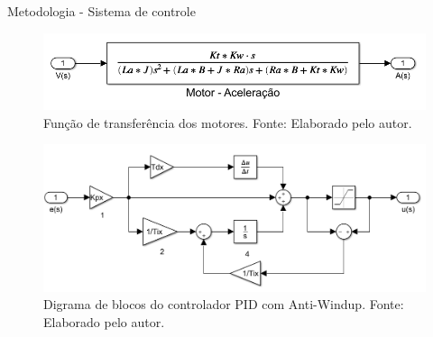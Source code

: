 \documentclass{beamer}
\begin{document}
\begin{frame}{Metodologia - Sistema de controle}
    \begin{figure}[HT]
		\begin{center}
		\captionsetup{justification=centering}
        \includegraphics[scale=.25]{../metodologia/img/modelo_satelite_motor}
        \caption{Função de transferência dos motores. \newline
        		 Fonte: Elaborado pelo autor.}
		\label{FIG_ADAPTATIVO}
        \end{center}
	\end{figure}

    \begin{figure}[HT]
		\begin{center}
		\captionsetup{justification=centering}
        \includegraphics[scale=.25]{../metodologia/img/matlab_pid_antiwindup}
        \caption{Digrama de blocos do controlador PID com Anti-Windup. \newline
        		 Fonte: Elaborado pelo autor.}
		\label{FIG_ADAPTATIVO}
        \end{center}
	\end{figure}
\end{frame}

\end{document}
